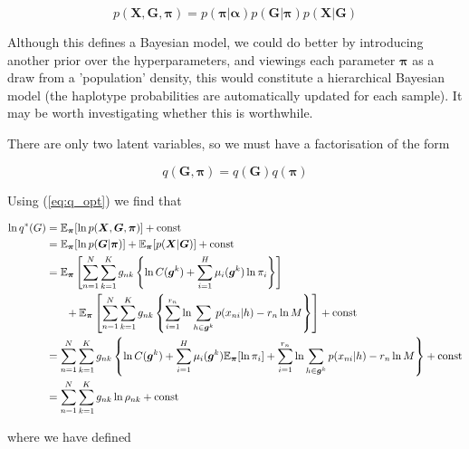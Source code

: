 \documentclass{article}
\begin{document}
\begin{equation}
p(\boldsymbol{X}, \boldsymbol{G}, \boldsymbol{\pi}) = p(\boldsymbol{\pi} | \boldsymbol{\alpha}) p(\boldsymbol{G} | \boldsymbol{\pi}) p(\boldsymbol{X} | \boldsymbol{G})
\end{equation}

Although this defines a Bayesian model, we could do better by introducing another prior over the hyperparameters, and viewings each parameter $\boldsymbol{\pi}$ as a draw from a 'population' density, this would constitute a hierarchical Bayesian model (the haplotype probabilities are automatically updated for each sample). It may be worth investigating whether this is worthwhile. 

There are only two latent variables, so we must have a factorisation of the form

\begin{equation}
q(\boldsymbol{G}, \boldsymbol{\pi}) = q(\boldsymbol{G})q(\boldsymbol{\pi})
\end{equation}

Using (\ref{eq:q_opt}) we find that

\begin{align}
    \ln q^*(G) &= \mathbb{E}_{\boldsymbol{\pi}}[\ln p(\boldsymbol{X}, \boldsymbol{G}, \boldsymbol{\pi})] + \text{const}\notag\\
    &= \mathbb{E}_{\boldsymbol{\pi}}[\ln p(\boldsymbol{G} | \boldsymbol{\pi})] + \mathbb{E}_{\boldsymbol{\pi}}[p(\boldsymbol{X} | \boldsymbol{G})] + \text{const} \notag\\
    &= \mathbb{E}_{\boldsymbol{\pi}}\left[ \sum_{n = 1}^N \sum_{k = 1}^K g_{nk} \left\{ \ln C(\boldsymbol{g}^k) + \sum_{i = 1}^H \mu_i(\boldsymbol{g}^k) \ln \pi_i \right\} \right] \notag\\ &\phantom{{}=1} + \mathbb{E}_{\boldsymbol{\pi}}\left[ \sum_{n = 1}^N \sum_{k = 1}^K g_{nk} \left\{ \sum_{i = 1}^{r_n} \ln \sum_{h \in \boldsymbol{g}^k} p(x_{ni} | h) - r_n \ln M \right\} \right] + \text{const}\notag\\
    &= \sum_{n = 1}^N \sum_{k = 1}^K g_{nk} \left\{ \ln C(\boldsymbol{g}^k) + \sum_{i = 1}^H \mu_i(\boldsymbol{g}^k) \mathbb{E}_{\boldsymbol{\pi}}[\ln \pi_i] + \sum_{i = 1}^{r_n} \ln \sum_{h \in \boldsymbol{g}^k} p(x_{ni} | h) - r_n \ln M \right\} + \text{const}\notag\\
    &= \sum_{n = 1}^N \sum_{k = 1}^K g_{nk} \ln \rho_{nk} + \text{const}
\end{align}

where we have defined
\end{document}
